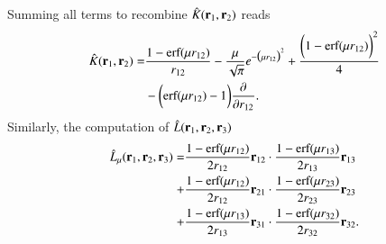 \documentclass[aip,jcp,reprint,noshowkeys,superscriptaddress]{revtex4-1}
\newcommand{\deriv}[3]{\frac{\partial^{#3} #1}{\partial {#2}^{#3}}}
\newcommand{\bri}[1]{{\bf r}_{#1}}
\begin{document}
Summing all terms to recombine $\hat{K}(\bri{1},\bri{2})$ reads 
\begin{equation}
 \label{eq:k_final}
  \begin{aligned}
   \hat{K}(\bri{1},\bri{2}) = & \frac{1 - \text{erf}(\mu r_{12})}{r_{12}} - \frac{\mu}{\sqrt{\pi}} e^{-\big(\mu r_{12} \big)^2} + \frac{\bigg(1 -     \text{erf}(\mu r_{12}) \bigg)^2}{4} \\
& - \bigg( \text{erf}(\mu r_{12}) - 1\bigg) \deriv{}{r_{12}}{}.
  \end{aligned}
\end{equation}
Similarly, the computation of $\hat{L}(\bri{1},\bri{2},\bri{3}) $ 
\begin{equation}
 \label{eq:l_final}
 \begin{aligned}
 \hat{L}_\mu(\bri{1},\bri{2},\bri{3}) = & \frac{1 - \text{erf}(\mu r_{12})}{2 r_{12}} \bri{12} \cdot \frac{1 - \text{erf}(\mu r_{13})}{2 r_{13}} \bri{13} \\
                                      + & \frac{1 - \text{erf}(\mu r_{12})}{2 r_{12}} \bri{21} \cdot \frac{1 - \text{erf}(\mu r_{23})}{2 r_{23}} \bri{23} \\
                                      + & \frac{1 - \text{erf}(\mu r_{13})}{2 r_{13}} \bri{31} \cdot \frac{1 - \text{erf}(\mu r_{32})}{2 r_{32}} \bri{32}.
 \end{aligned}                    
\end{equation}
\end{document}
